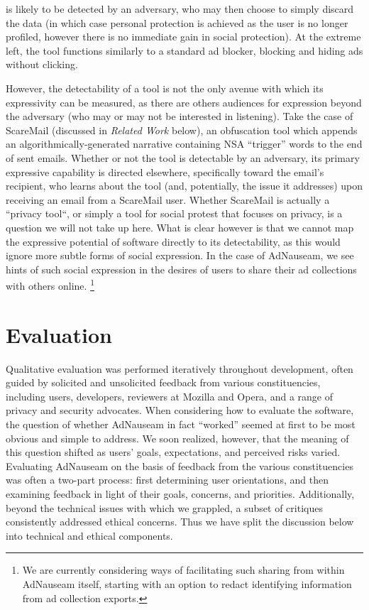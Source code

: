 \documentclass[conference]{IEEEtran}
\begin{document}
is likely to be detected by an adversary, who may then choose to simply discard the data (in which case personal protection is achieved as the user is no longer profiled, however there is no immediate gain in social protection). At the extreme left, the tool functions similarly to a standard ad blocker, blocking and hiding ads without clicking.

However, the detectability of a tool is not the only avenue with which its expressivity can be measured, as there are others audiences for expression beyond the adversary (who may or may not be interested in listening). Take the case of ScareMail (discussed in \emph{Related Work} below), an obfuscation tool which appends an algorithmically-generated narrative containing NSA “trigger” words to the end of sent emails. Whether or not the tool is detectable by an adversary, its primary expressive capability is directed elsewhere, specifically toward the email's recipient, who learns about the tool (and, potentially, the issue it addresses) upon receiving an email from a ScareMail user. Whether ScareMail is actually a “privacy tool“, or simply a tool for social protest that focuses on privacy, is a question we will not take up here. What is clear however is that we cannot map the expressive potential of software directly to its detectability, as this would ignore more subtle forms of social expression. In the case of AdNauseam, we see hints of such social expression in the desires of users to share their ad collections with others online. \footnote{We are currently considering ways of facilitating such sharing from within AdNauseam itself, starting with an option to redact identifying information from ad collection exports.}


\section{Evaluation}

Qualitative evaluation was performed iteratively throughout development, often guided by solicited and unsolicited feedback from various constituencies, including users, developers, reviewers at Mozilla and Opera, and a range of privacy and security advocates. When considering how to evaluate the software, the question of whether AdNauseam in fact “worked” seemed at first to be most obvious and simple to address. We soon realized, however, that the meaning of this question shifted as users' goals, expectations, and perceived risks varied. Evaluating AdNauseam on the basis of feedback from the various constituencies was often a two-part process: first determining user orientations, and then examining feedback in light of their goals, concerns, and priorities. Additionally, beyond the technical issues with which we grappled, a subset of critiques consistently addressed ethical concerns. Thus we have split the discussion below into technical and ethical components.
\end{document}
